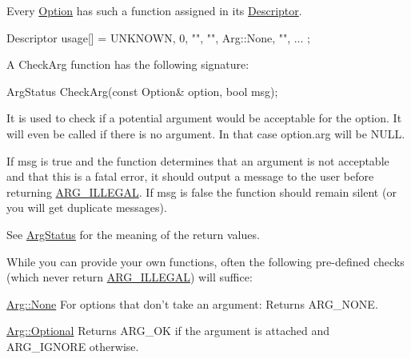 \-Every \hyperlink{classoption_1_1_option}{\-Option} has such a function assigned in its \hyperlink{structoption_1_1_descriptor}{\-Descriptor}. 
\begin{DoxyCode}
 Descriptor usage[] = { {UNKNOWN, 0, "", "", Arg::None, ""}, ... };
\end{DoxyCode}


\-A \-Check\-Arg function has the following signature\-: 
\begin{DoxyCode}
 ArgStatus CheckArg(const Option& option, bool msg); 
\end{DoxyCode}


\-It is used to check if a potential argument would be acceptable for the option. \-It will even be called if there is no argument. \-In that case {\ttfamily option.\-arg} will be {\ttfamily \-N\-U\-L\-L}.

\-If {\ttfamily msg} is {\ttfamily true} and the function determines that an argument is not acceptable and that this is a fatal error, it should output a message to the user before returning \hyperlink{namespaceoption_aee8c76a07877335762631491e7a5a1a9a9528e32563b795bd2930b12d0a5e382d}{\-A\-R\-G\-\_\-\-I\-L\-L\-E\-G\-A\-L}. \-If {\ttfamily msg} is {\ttfamily false} the function should remain silent (or you will get duplicate messages).

\-See \hyperlink{namespaceoption_aee8c76a07877335762631491e7a5a1a9}{\-Arg\-Status} for the meaning of the return values.

\-While you can provide your own functions, often the following pre-\/defined checks (which never return \hyperlink{namespaceoption_aee8c76a07877335762631491e7a5a1a9a9528e32563b795bd2930b12d0a5e382d}{\-A\-R\-G\-\_\-\-I\-L\-L\-E\-G\-A\-L}) will suffice\-:

\begin{DoxyItemize}
\item {\ttfamily \hyperlink{structoption_1_1_arg_a7fc01987899c91c6b6a1be5711a46e22}{\-Arg\-::\-None}} \-For options that don't take an argument\-: \-Returns \-A\-R\-G\-\_\-\-N\-O\-N\-E.  \item {\ttfamily \hyperlink{structoption_1_1_arg_aadb5316ecbc9eb0a7f0019d14bf35ad0}{\-Arg\-::\-Optional}} \-Returns \-A\-R\-G\-\_\-\-O\-K if the argument is attached and \-A\-R\-G\-\_\-\-I\-G\-N\-O\-R\-E otherwise.  \end{DoxyItemize}


